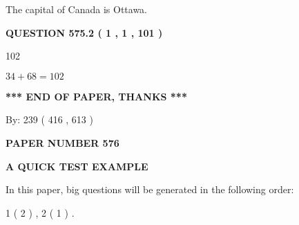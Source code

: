 \documentclass[12pt]{article}
\begin{document}
 
The capital of Canada is Ottawa.
 
 
 
 
  
\vspace{0.2in}
  
{\textbf{\Large{QUESTION
575.2 
 ( 1 , 1 , 101 )
}}}
  
  
 
 
\noindent{}

102
 
 
 
 
\noindent{}

$ %
34 +  %
68=   %
102$
 
 
   
   
 \vspace{0.2in}
 
   
   
   
   
\vspace{1.0in} 
{\textbf{\large{ *** END OF PAPER, THANKS *** }}} 
   
   
\hspace{1.0in} By: 
 239 ( 416 ,  613 )
   
   
   
   
\newpage 
\setcounter{page}{ 
   576001 } 
   
   
   
   
 {\textbf{ \Large{ PAPER NUMBER  576  }}}
   
   
\vspace{0.2in}
   
   
   
   
   
   
 \vspace{0.2in}
{\LARGE {\textbf{ A QUICK TEST EXAMPLE}}}
   
   
   
\vspace{0.2in}
   
In this paper, big questions will be generated in the following order: 
   
   
   1 ( 2 )
 ,
   2 ( 1 )
 .
  
\vspace{0.2in}
  
\end{document}

